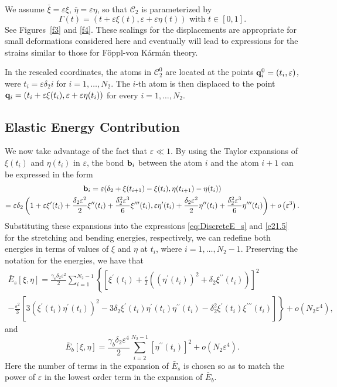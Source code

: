 \documentclass{siamltex}
\newcommand{\bq}{{\bf q}}
\newcommand{\bb}{{\bf b}}
\newcommand{\eps}{\varepsilon}
\begin{document}
We assume $\bar{\xi}=\varepsilon\xi$, $\bar{\eta}=\varepsilon\eta$,
so that $\mathcal{C}_{2}$ is parameterized by
%
\begin{equation}
 \Gamma(t)
  = (t+\varepsilon\xi(t), \varepsilon+\varepsilon \eta(t)) \mbox{ with } t\in[0,1].
  \label{ee10}
\end{equation}
%
See Figures~\ref{f3} and \ref{f4}.  
These scalings for the displacements are appropriate for small deformations considered here and
eventually will lead to expressions for the strains similar to those for F\"oppl-von
K\'arm\'an theory.  

In the rescaled coordinates, the atoms in $\mathcal{C}_{2}^0$ are located at the points $\bq_i^0=(t_{i},\eps)$, were $t_i=\eps\delta_2i$ for $i=1,\ldots,N_2$. The $i$-th atom is then displaced to the point
$\bq_i=(t_{i}+\eps\xi(t_{i}),\eps+\eps\eta(t_{i}))$ for every $i=1,\ldots,N_2$. 

\subsection{Elastic Energy Contribution} \label{elencon}

We now take advantage of the fact that $\eps\ll1$. By using the Taylor expansions of $\xi(t_i)$ and $\eta(t_i)$ in $\eps$, the bond $\bb_i$ between the atom $i$ and the atom $i+1$ can be expressed in the form
\begin{multline}
\label{eq:bond}
\bb_i =\eps(\delta_2+\xi(t_{i+1})-\xi(t_{i}),\eta(t_{i+1})-\eta(t_{i}))\\=\eps\delta_2\left(1+\eps\xi^\prime(t_i)+\frac{\delta_2\eps^2}{2}\xi^{\prime\prime}(t_i)+\frac{\delta_2^2\eps^3}{6}\xi^{\prime\prime\prime}(t_i),\eps\eta^\prime(t_i)+\frac{\delta_2\eps^2}{2}\eta^{\prime\prime}(t_i)+\frac{\delta_2^2\eps^3}{6}\eta^{\prime\prime\prime}(t_i)\right)+o\left(\eps^3\right).
\end{multline}
Substituting these expansions into the expressions \eqref{eq:DiscreteE_s} and \eqref{e21.5} for the stretching and bending energies, respectively, we can redefine both energies in terms of values of $\xi$ and $\eta$ at $t_i$, where $i=1,\ldots,N_2-1$. Preserving the notation for the energies, we have that
\begin{multline}
\label{stretch}
\bar E_s[\xi,\eta]=\frac{\gamma_e\delta_2\eps^2}{2}\sum_{i=1}^{N_2-1} \left\{{\left[\xi^\prime(t_i)+\frac{\eps}{2}\left({\left(\eta^\prime(t_i)\right)}^2+\delta_2\xi^{\prime\prime}(t_i)\right)\right]}^2\right.\\\left.-\frac{\eps^2}{3}\left[3{\left(\xi^\prime(t_i)\eta^\prime(t_i)\right)}^2-3\delta_2\xi^\prime(t_i)\eta^\prime(t_i)\eta^{\prime\prime}(t_i)-\delta_2^2\xi^\prime(t_i)\xi^{\prime\prime\prime}(t_i)\right]\right\}+o\left(N_2\eps^4\right),
\end{multline}
and
\begin{equation}
\label{bend}
\bar E_b[\xi,\eta]= \frac{\gamma_b\delta_2\eps^4}{2}\sum_{i=2}^{N_2-1} {\left[\eta^{\prime\prime}(t_i)\right]}^2+o\left(N_2\eps^4\right).
\end{equation}
Here the number of terms in the expansion of $\bar E_s$ is chosen so as to match the power of $\eps$ in the lowest order term in the expansion of $\bar E_b$.
\end{document}

